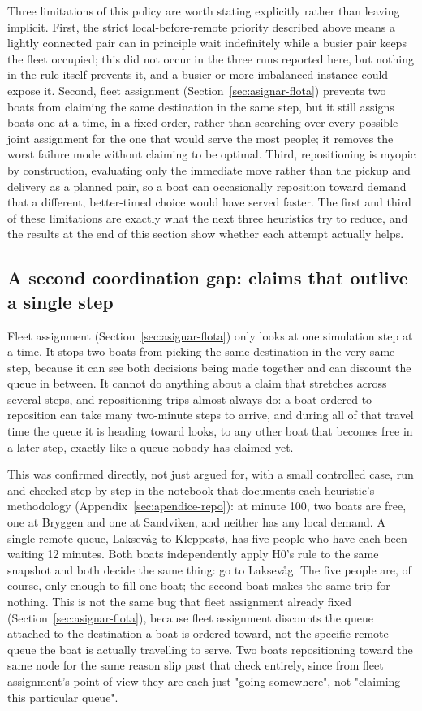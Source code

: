 \documentclass[11pt,a4paper]{article}
\begin{document}
Three limitations of this policy are worth stating explicitly rather than leaving implicit. First, the strict local-before-remote priority described above means a lightly connected pair can in principle wait indefinitely while a busier pair keeps the fleet occupied; this did not occur in the three runs reported here, but nothing in the rule itself prevents it, and a busier or more imbalanced instance could expose it. Second, fleet assignment (Section~\ref{sec:asignar-flota}) prevents two boats from claiming the same destination in the same step, but it still assigns boats one at a time, in a fixed order, rather than searching over every possible joint assignment for the one that would serve the most people; it removes the worst failure mode without claiming to be optimal. Third, repositioning is myopic by construction, evaluating only the immediate move rather than the pickup and delivery as a planned pair, so a boat can occasionally reposition toward demand that a different, better-timed choice would have served faster. The first and third of these limitations are exactly what the next three heuristics try to reduce, and the results at the end of this section show whether each attempt actually helps.

\subsection{A second coordination gap: claims that outlive a single step}
\label{sec:h1-motivacion}

Fleet assignment (Section~\ref{sec:asignar-flota}) only looks at one simulation step at a time. It stops two boats from picking the same destination in the very same step, because it can see both decisions being made together and can discount the queue in between. It cannot do anything about a claim that stretches across several steps, and repositioning trips almost always do: a boat ordered to reposition can take many two-minute steps to arrive, and during all of that travel time the queue it is heading toward looks, to any other boat that becomes free in a later step, exactly like a queue nobody has claimed yet.

This was confirmed directly, not just argued for, with a small controlled case, run and checked step by step in the notebook that documents each heuristic's methodology (Appendix~\ref{sec:apendice-repo}): at minute 100, two boats are free, one at Bryggen and one at Sandviken, and neither has any local demand. A single remote queue, Laksevåg to Kleppestø, has five people who have each been waiting 12 minutes. Both boats independently apply H0's rule to the same snapshot and both decide the same thing: go to Laksevåg. The five people are, of course, only enough to fill one boat; the second boat makes the same trip for nothing. This is not the same bug that fleet assignment already fixed (Section~\ref{sec:asignar-flota}), because fleet assignment discounts the queue attached to the destination a boat is ordered toward, not the specific remote queue the boat is actually travelling to serve. Two boats repositioning toward the same node for the same reason slip past that check entirely, since from fleet assignment's point of view they are each just "going somewhere", not "claiming this particular queue".
\end{document}
